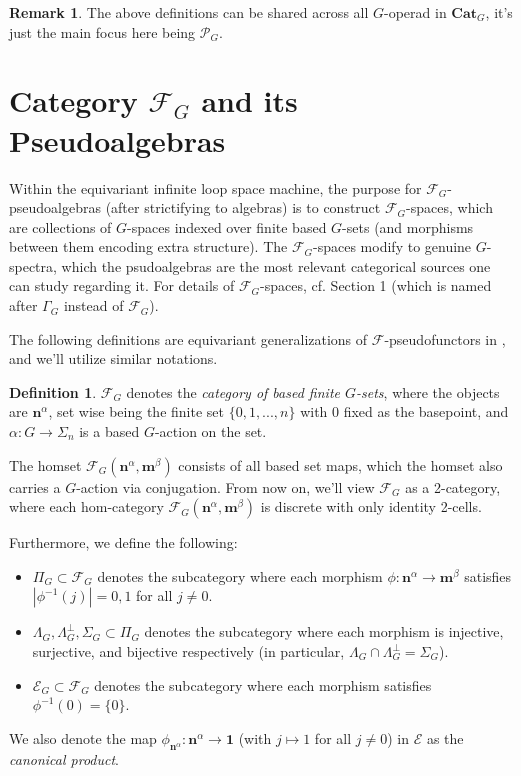 \documentclass[openany, amssymb, psamsfonts]{amsart}
\theoremstyle{definition}
\newtheorem{defn}{Definition}[section]
\newtheorem{rem}{Remark}[section]
\numberwithin{equation}{section}
\newcommand{\Cat}{\mathbf{Cat}} %
\newcommand{\F}{\mathscr{F}} %
\newcommand{\cP}{\mathscr{P}} %
\begin{document}
\begin{rem}\label{rem_gen_G_op}
    The above definitions can be shared across all $G$-operad in $\Cat_G$, it's just the main focus here being $\cP_G$.
\end{rem}

\vspace{1pt}

\section{Category $\F_G$ and its Pseudoalgebras}\label{sec_F_Gm}

Within the equivariant infinite loop space machine, the purpose for $\F_G$- pseudoalgebras (after strictifying to algebras) is to construct $\F_G$-spaces, which are collections of $G$-spaces indexed over finite based $G$-sets (and morphisms between them encoding extra structure). The $\F_G$-spaces modify to genuine $G$-spectra, which the psudoalgebras are the most relevant categorical sources one can study regarding it. For details of $\F_G$-spaces, cf. \cite{S89} Section 1 (which is named after $\Gamma_G$ instead of $\F_G$).

The following definitions are equivariant generalizations of $\F$-pseudofunctors in \cite{LMRZ26}, and we'll utilize similar notations.

\vspace{1pt}

\begin{defn}
    $\F_G$ denotes the \emph{category of based finite $G$-sets}, where the objects are $\mathbf{n}^\alpha$, set wise being the finite set $\{0,1,...,n\}$ with $0$ fixed as the basepoint, and $\alpha:G\rightarrow\Sigma_n$ is a based $G$-action on the set.

    The homset $\F_G(\mathbf{n}^\alpha,\mathbf{m}^\beta)$ consists of all based set maps, which the homset also carries a $G$-action via conjugation. From now on, we'll view $\F_G$ as a 2-category, where each hom-category $\F_G(\mathbf{n}^\alpha,\mathbf{m}^\beta)$ is discrete with only identity 2-cells.

    Furthermore, we define the following:
    \begin{itemize}
        \item $\Pi_G\subset \F_G$ denotes the subcategory where each morphism $\phi:\mathbf{n}^\alpha\rightarrow\mathbf{m}^\beta$ satisfies $|\phi^{-1}(j)| = 0,1$ for all $j\neq 0$.
        \item $\Lambda_G,\Lambda_G^\perp,\Sigma_G\subset\Pi_G$ denotes the subcategory where each morphism is injective, surjective, and bijective respectively (in particular, $\Lambda_G\cap \Lambda_G^\perp = \Sigma_G$).
        \item $\mathscr{E}_G\subset \F_G$ denotes the subcategory where each morphism satisfies $\phi^{-1}(0)=\{0\}$.
    \end{itemize}
    We also denote the map $\phi_{\mathbf{n}^\alpha}:\mathbf{n}^\alpha\rightarrow\mathbf{1}$ (with $j\mapsto 1$ for all $j\neq 0$) in $\mathscr{E}$ as the \emph{canonical product}.
\end{defn}
\end{document}

